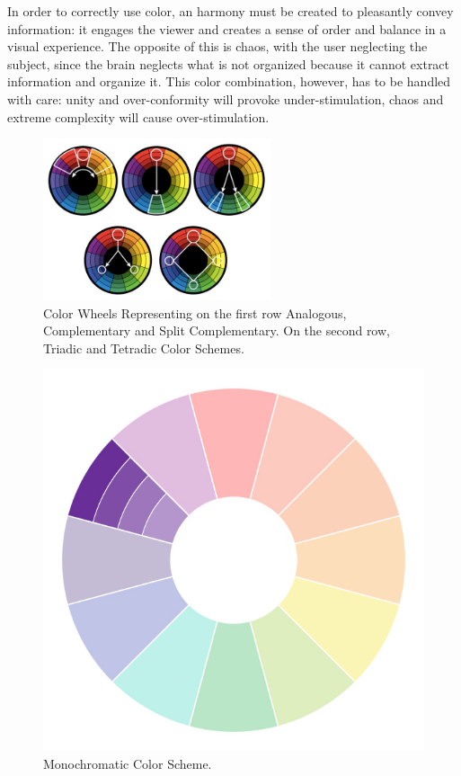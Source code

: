 \documentclass{report}
\begin{document}
%
In order to correctly use color, an harmony must be created to pleasantly convey information: it engages
the viewer and creates a sense of order and balance in a visual experience. The opposite of this is chaos,
with the user neglecting the subject, since the brain neglects what is not organized because it cannot
extract information and organize it. This color combination, however, has to be handled with care: unity
and over-conformity will provoke under-stimulation, chaos and extreme complexity will cause over-stimulation. \par
%
\begin{figure}[H]
	\centering
    \vspace{-15pt}
    \includegraphics[width=0.6\textwidth]{SchemesTogether.jpg}
    \caption[Color Schemes Wheels]{Color Wheels Representing on the first row Analogous, Complementary and
    Split Complementary. On the second row, Triadic and Tetradic Color Schemes.\protect\footnotemark{}}
    \vspace{-15pt}
    \label{fig:wheels}
\end{figure}
%
\begin{figure}
  \centering
  \vspace{-1\baselineskip}
  \includegraphics[width=0.7\linewidth]{monochromatic.jpg}
  \caption[Monochromatic Color Scheme]{Monochromatic Color Scheme.\protect\footnotemark{}}
  \label{fig:monochromatic}
\end{figure}
\end{document}
